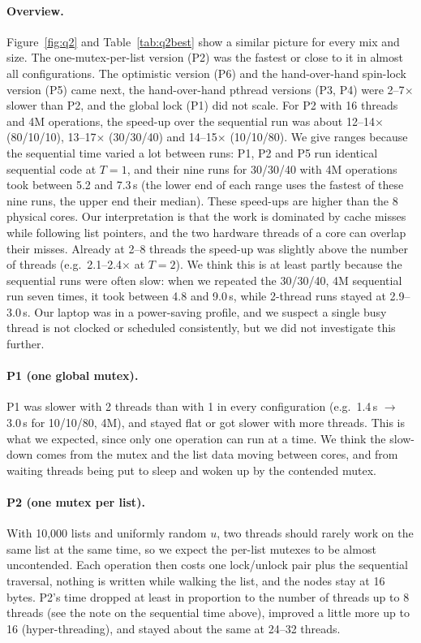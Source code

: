 \paragraph{Overview.}
Figure~\ref{fig:q2} and Table~\ref{tab:q2best} show a similar picture for every mix and size. The one-mutex-per-list version (P2) was the fastest or close to it in almost all configurations.
The optimistic version (P6) and the hand-over-hand spin-lock version (P5) came next, the hand-over-hand pthread versions (P3, P4) were 2--7$\times$ slower than P2,
and the global lock (P1) did not scale. For P2 with 16 threads and 4M operations, the speed-up over the sequential run was
about 12--14$\times$ (80/10/10), 13--17$\times$ (30/30/40) and 14--15$\times$ (10/10/80). We give ranges because the sequential time varied a lot between runs:
P1, P2 and P5 run identical sequential code at $T=1$, and their nine runs for 30/30/40 with 4M operations took between 5.2 and 7.3\,s
(the lower end of each range uses the fastest of these nine runs, the upper end their median). These speed-ups are higher than the 8 physical cores. Our interpretation is that the work is dominated by
cache misses while following list pointers, and the two hardware threads of a core can overlap their misses.
Already at 2--8 threads the speed-up was slightly above the number of threads (e.g.\ 2.1--2.4$\times$ at $T=2$). We think this is at least partly because the sequential runs
were often slow: when we repeated the 30/30/40, 4M sequential run seven times, it took between 4.8 and 9.0\,s, while 2-thread runs stayed at 2.9--3.0\,s.
Our laptop was in a power-saving profile, and we suspect a single busy thread is not clocked or scheduled consistently, but we did not investigate this further.

\paragraph{P1 (one global mutex).}
P1 was slower with 2 threads than with 1 in every configuration (e.g.\ 1.4\,s $\to$ 3.0\,s for 10/10/80, 4M), and stayed flat or got slower with more threads.
This is what we expected, since only one operation can run at a time. We think the slow-down comes from the mutex and the list data moving between cores,
and from waiting threads being put to sleep and woken up by the contended mutex.

\paragraph{P2 (one mutex per list).}
With 10{,}000 lists and uniformly random $u$, two threads should rarely work on the same list at the same time, so we expect the per-list mutexes to be almost uncontended.
Each operation then costs one lock/unlock pair plus the sequential traversal, nothing is written while walking the list, and the nodes stay at 16 bytes.
P2's time dropped at least in proportion to the number of threads up to 8 threads (see the note on the sequential time above), improved a little more up to 16 (hyper-threading),
and stayed about the same at 24--32 threads.

